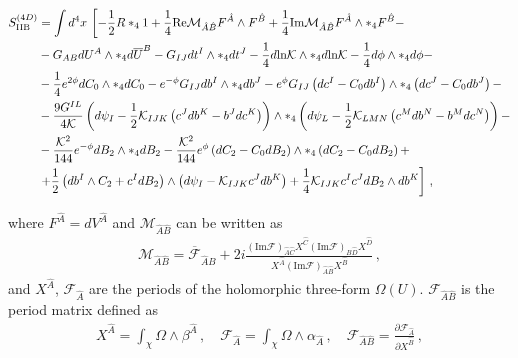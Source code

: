 \documentclass[12pt,a4paper]{book}
\begin{document}
\begin{footnotesize}
\begin{align}
\label{eq:N2effectiveaction}
S^{(4D)}_{\rm IIB} &= \int d^4 x\, \left[-\frac{1}{2} R *_4 1 + \frac{1}{4} \text{Re} \mathcal{M}_{\hat{A} \hat{B}} F^{\hat{A}} \wedge F^{\hat{B}} + \frac{1}{4} \text{Im} \mathcal{M}_{\hat{A} \hat{B}} F^{\hat{A}} \wedge *_4 F^{\hat{B}} -\right. \nonumber \\
&- G_{AB} dU^A \wedge *_4 d \overline{U}^B - G_{IJ} dt^I \wedge *_4 dt^J - \frac{1}{4} d \text{ln} \mathcal{K} \wedge *_4 d \text{ln} \mathcal{K} - \frac{1}{4} d\phi \wedge *_4 d\phi - \nonumber \\
&- \frac{1}{4} e^{2 \phi} d C_0 \wedge *_4 d C_0 - e^{-\phi} G_{IJ} db^I \wedge *_4 db^J - e^{\phi} G_{IJ} \left(dc^I - C_0 db^I\right) \wedge *_4 \left(dc^J - C_0 db^J\right) - \nonumber \\
&- \frac{9 G^{IL}}{4 \mathcal{K}} \left(d\psi_I - \frac{1}{2} \mathcal{K}_{IJK} \left(c^J db^K - b^J dc^K\right)\right) \wedge *_4 \left(d\psi_L - \frac{1}{2} \mathcal{K}_{LMN} \left(c^M db^N - b^M dc^N\right)\right) - \nonumber \\
&- \frac{\mathcal{K}^2}{144} e^{-\phi} dB_2 \wedge *_4 dB_2 - \frac{\mathcal{K}^2}{144} e^{\phi} \left(dC_2 - C_0 dB_2\right) \wedge *_4 \left(dC_2 - C_0 dB_2\right) + \nonumber \\
&\left. + \frac{1}{2} \left(db^I \wedge C_2 + c^I dB_2\right) \wedge \left(d\psi_I - \mathcal{K}_{IJK} c^J db^K\right) + \frac{1}{4} \mathcal{K}_{IJK} c^I c^J dB_2 \wedge db^K \right]\,,
\end{align}
\end{footnotesize}
where $F^{\hat{A}} = d V^{\hat{A}}$ and $\mathcal{M}_{\hat{A} \hat{B}}$ can be written as
\begin{align}
\label{eq:MKL}
\mathcal{M}_{\hat{A} \hat{B}} = \overline{\mathcal{F}}_{\hat{A} \hat{B}} + 2i \frac{\left(\text{Im} \mathcal{F}\right)_{\hat{A} \hat{C}} X^{\hat{C}} \left(\text{Im} \mathcal{F}\right)_{\hat{B} \hat{D}} X^{\hat{D}}}{X^{\hat{A}} \left(\text{Im} \mathcal{F}\right)_{\hat{A} \hat{B}} X^{\hat{B}}} \,,
\end{align}
and $X^{\hat{A}}$, $\mathcal{F}_{\hat{A}}$ are the periods of the holomorphic three-form $\Omega(U)$. $\mathcal{F}_{\hat{A} \hat{B}}$ is the period matrix defined as
\begin{align}
\label{eq:Periods}
X^{\hat{A}} = \int_{\chi} \Omega \wedge \beta^{\hat{A}} \,, \quad \mathcal{F}_{\hat{A}} = \int_{\chi} \Omega \wedge \alpha_{\hat{A}} \,, \quad \mathcal{F}_{\hat{A} \hat{B}} = \frac{\partial \mathcal{F}_{\hat{A}}}{\partial X^{\hat{B}}} \,,
\end{align}
\end{document}
